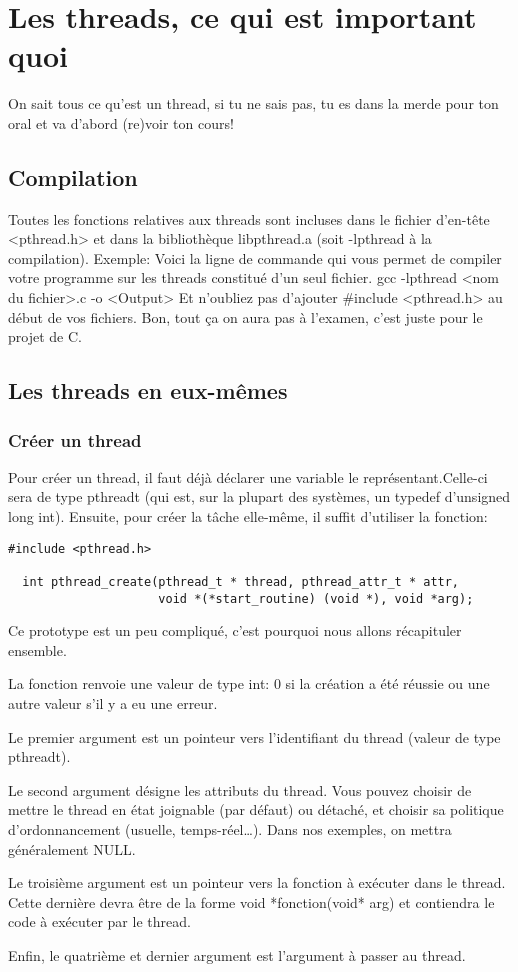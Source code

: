 \documentclass[a4paper]{article}
\begin{document}
\section{Les threads, ce qui est important quoi}
On sait tous ce qu'est un thread, si tu ne sais pas, tu es dans la merde pour ton oral et va d'abord (re)voir ton cours!
\subsection{Compilation}
Toutes les fonctions relatives aux threads sont incluses dans le fichier d'en-tête <pthread.h> et dans la bibliothèque libpthread.a (soit -lpthread à la compilation).\newline
Exemple:\newline
Voici la ligne de commande qui vous permet de compiler votre programme sur les threads constitué d'un seul fichier.\newline
gcc -lpthread <nom du fichier>.c -o <Output>\newline
Et n'oubliez pas d'ajouter \#include <pthread.h> au début de vos fichiers.
Bon, tout ça on aura pas à l'examen, c'est juste pour le projet de C.
\subsection{Les threads en eux-mêmes}
\subsubsection{Créer un thread}
Pour créer un thread, il faut déjà déclarer une variable le représentant.Celle-ci sera de type pthread\textunderscore{}t (qui est, sur la plupart des systèmes, un typedef d'unsigned long int). Ensuite, pour créer la tâche elle-même, il suffit d'utiliser la fonction:
\begin{lstlisting}
#include <pthread.h>

  int pthread_create(pthread_t * thread, pthread_attr_t * attr,
                     void *(*start_routine) (void *), void *arg);
\end{lstlisting}
Ce prototype est un peu compliqué, c'est pourquoi nous allons récapituler ensemble.
\begin{description}
  \item La fonction renvoie une valeur de type int: 0 si la création a été réussie ou une autre valeur s'il y a eu une erreur.
  \item Le premier argument est un pointeur vers l'identifiant du thread (valeur de type pthread\textunderscore{}t).
  \item Le second argument désigne les attributs du thread. Vous pouvez choisir de mettre le thread en état joignable (par défaut) ou détaché, et choisir sa politique d'ordonnancement (usuelle, temps-réel\ldots). Dans nos exemples, on mettra généralement NULL.
  \item Le troisième argument est un pointeur vers la fonction à exécuter dans le thread. Cette dernière devra être de la forme \guillemotleft{}void *fonction(void* arg)\guillemotright{} et contiendra le code à exécuter par le thread.
  \item Enfin, le quatrième et dernier argument est l'argument à passer au thread.
\end{description}
\end{document}
